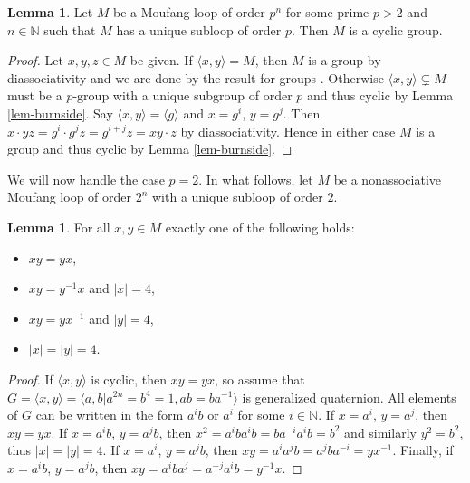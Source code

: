 \documentclass[12pt]{report}
\theoremstyle{definition}
\newtheorem{lem}[thm]{Lemma}
\begin{document}
\begin{lem}\label{not2power}
	Let $M$ be a Moufang loop of order $p^n$ for some prime $p > 2$ and $n\in\mathbb{N}$ such that $M$ has a
    unique subloop of order $p$. Then $M$ is a cyclic group.
\end{lem}

\begin{proof}
    Let $x, y, z\in M$ be given. If $\langle x, y\rangle = M$, then $M$ is a group by diassociativity and
      we are done by the result for groups \cite{Burnside}. Otherwise $\langle x, y\rangle \subsetneq M$
      must be a $p$-group with a unique subgroup of order $p$ and thus cyclic by Lemma \ref{lem-burnside}.
      Say $\langle x, y\rangle = \langle g\rangle$ and $x = g^i$, $y = g^j$. Then
      $x\cdot yz = g^i \cdot g^j z = g^{i + j}z = xy\cdot z$ by diassociativity. Hence in either case 
      $M$ is a group and thus cyclic by Lemma \ref{lem-burnside}.
\end{proof}

We will now handle the case $p = 2$. In what follows, let $M$ be a nonassociative Moufang loop of order $2^n$
  with a unique subloop of order $2$.

\begin{lem}\label{order-lem}
	For all $x, y\in M$ exactly one of the following holds:
  \begin{itemize}
    \item $xy = yx$,
    \item $xy = y^{-1}x$ and $|x| = 4$,
    \item $xy = yx^{-1}$ and $|y| = 4$,
    \item $|x| = |y| = 4$.
  \end{itemize}
\end{lem}

\begin{proof}
	If $\langle x, y\rangle$ is cyclic, then $xy = yx$, so assume that
    $G = \langle x, y\rangle = \langle a, b | a^{2n} = b^4 = 1, ab = ba^{-1}\rangle$ is generalized
    quaternion. All elements of $G$ can be written in the form $a^i b$ or $a^i$ for some
    $i\in\mathbb{N}$. If $x = a^i$, $y = a^j$, then $xy = yx$. If $x = a^i b$, $y = a^j b$,
    then $x^2 = a^i b a^i b = b a^{-i} a^i b = b^2$ and similarly $y^2 = b^2$,
    thus $|x| = |y| = 4$. If $x = a^i$, $y = a^j b$, then $xy = a^i a^j b = a^j b a^{-i} = yx^{-1}$.
    Finally, if $x = a^i b$, $y = a^j b$, then $xy = a^i b a^j = a^{-j} a^i b = y^{-1} x$.
\end{proof}
\end{document}
